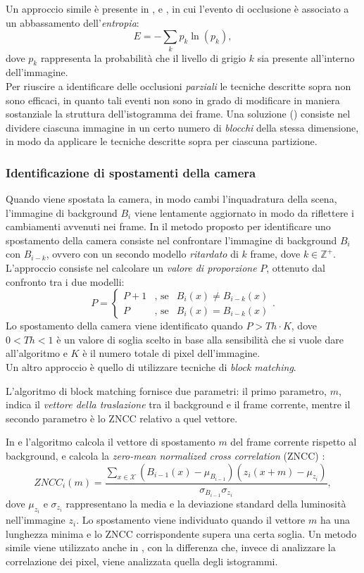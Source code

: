 Un approccio simile \`e presente in \cite{harasse2004automated}, \cite{gil2007automatic} e \cite{ellwart2012camera}, in cui l'evento di occlusione \`e associato a un abbassamento dell'\textit{entropia}:
 \[
 \label{eq:entropy}
 E=-\sum_{k}p_k\ln(p_k) ,
 \]
 dove $p_k$ rappresenta la probabilit\`a che il livello di grigio $k$ sia presente all'interno dell'immagine. \\
 Per riuscire a identificare delle occlusioni \textit{parziali} le tecniche descritte sopra non sono efficaci, in quanto tali eventi non sono in grado di modificare in maniera sostanziale la struttura dell'istogramma dei frame.
 Una soluzione (\cite{gil2007automatic}) consiste nel dividere ciascuna immagine in un certo numero di \textit{blocchi} della stessa dimensione, in modo da applicare le tecniche descritte sopra per ciascuna partizione.
\subsubsection{Identificazione di spostamenti della camera}
Quando viene spostata la camera, in modo cambi l'inquadratura della scena, l'immagine di background $B_i$ viene lentamente aggiornato in modo da riflettere i cambiamenti avvenuti nei frame. 
In \cite{saglam2009real} il metodo proposto per identificare uno spostamento della camera consiste nel confrontare l'immagine di background $B_i$ con $B_{i-k}$, ovvero con un secondo modello \textit{ritardato} di $k$ frame, dove $k \in \mathbb{Z}^+$.
L'approccio consiste nel calcolare un \textit{valore di proporzione} $P$, ottenuto dal confronto tra i due modelli:
\[
\label{eq:displEqSaglam}
P=\left\{ \begin{array} {lcl}
P+1 & \mbox{, se} & B_i(x) \neq B_{i-k}(x) \\
P & \mbox{, se} & B_i(x) = B_{i-k}(x) \end{array} \right. .
\]
Lo spostamento della camera viene identificato quando $P > Th \cdot K$, dove $0<Th<1$ \`e un valore di soglia scelto in base alla sensibilit\`a che si vuole dare all'algoritmo e $K$ \`e il numero totale di pixel dell'immagine.\\
Un altro approccio \`e quello di utilizzare tecniche di \textit{block matching}.

L'algoritmo di block matching fornisce due parametri:
il primo parametro, $m$, indica il \textit{vettore della traslazione} tra il background e il frame corrente, mentre il secondo parametro \`e lo ZNCC relativo a quel vettore.

In \cite{gil2007automatic} e \cite{harasse2004automated} l'algoritmo calcola il vettore di spostamento $m$ del frame corrente rispetto al background, e calcola la \textit{zero-mean normalized cross correlation} (ZNCC) \cite{roma2002comparative}:
\[
ZNCC_i(m) = \frac{\sum_{x \in \mathcal{X}}(B_{i-1}(x)- \mu_{B_{i-1}})(z_i(x+m)-\mu_{z_i})}{\sigma_{B_{i-1}} \sigma_{z_i}},
\]
dove $\mu_{z_i}$ e $\sigma_{z_i}$ rappresentano la media e la deviazione standard della luminosit\`a nell'immagine $z_i$.
Lo spostamento viene individuato quando il vettore $m$ ha una lunghezza minima e lo ZNCC corrispondente supera una certa soglia.
Un metodo simile viene utilizzato anche in \cite{kryjak2012fpga}, con la differenza che, invece di analizzare la correlazione dei pixel, viene analizzata quella degli istogrammi. 
